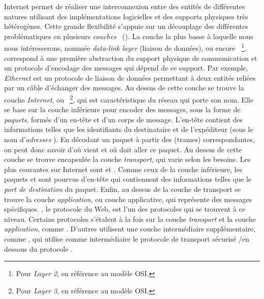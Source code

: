 Internet permet de réaliser une interconnexion entre des entités de différentes
natures utilisant des implémentations logicielles et des supports physiques très
hétérogènes. Cette grande flexibilité s'appuie sur un découplage des différentes
problématiques en plusieurs {\em
couches}~\cite{rfc1122,rfc1123,rfc3439,Zimmermann1980}
(). La couche la plus basse à laquelle nous nous
intéresserons, nommée {\em data-link layer} (liaison de données), ou encore
\LL~\footnote{Pour {\em Layer 2}, en référence au modèle OSI.}, correspond à une
première abstraction du support physique de communication et un protocole
d'encodage des messages qui dépend de ce support.
Par exemple, {\em Ethernet} est un protocole de liaison de données permettant à
deux entités reliées par un câble d'échanger des messages. Au dessus de cette
couche se trouve la couche {\em Internet}, ou \LLL~\footnote{Pour {\em Layer 3},
en référence au modèle OSI.}, qui est caractéristique du réseau qui porte son
nom.
Elle se base sur la couche inférieure pour encoder des messages, sous la forme
de {\em paquets}, formés d'un en-tête et d'un corps de message.
L'en-tête contient des informations telles que les identifiants du destinataire
et de l'expéditeur (sous le nom d'{\em adresses \ip}). En décodant un
paquet à partir des \frames (trames) correspondantes, on peut donc savoir d'où
vient et où doit aller ce paquet. Au dessus de cette couche se trouve encapsulée
la couche {\em transport}, qui varie selon les besoins. Les plus courantes sur
Internet sont \udp et \tcp.
Comme ceux de la couche inférieure, les paquets \udp{} et \tcp{}
sont pourvus d'en-tête qui contiennent des informations telles que le {\em port
de destination} du paquet. Enfin, au dessus de la couche de transport se trouve
la couche {\em application}, ou couche applicative, qui représente des messages
spécifiques. \http{}, le protocole du Web, est l'un des protocoles qui
se trouvent à ce niveau. Certains protocoles s'étalent à la fois sur la couche
{\em transport} et la couche {\em application}, comme \icmp{}. D'autres
utilisent une couche intermédiaire supplémentaire, comme \https{}, qui
utilise comme intermédiaire le protocole de transport sécurisé \tls/\ssl en
dessous du protocole \http.




